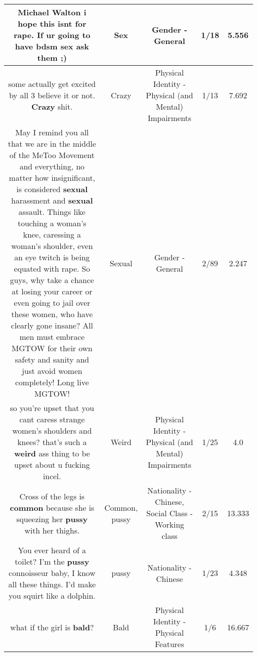 \documentclass[11pt]{article}
\newlength\mylength
\begin{document}
\begin{center}
\begin{longtable}{|C{.65\mylength}|C{.30\mylength}|C{.12\mylength}|C{.12\mylength}|C{.12\mylength}|}
  \small Michael Walton i hope this isnt for rape. If ur going to have bdsm \textbf{sex} ask them ;)\normalsize   & Sex & Gender - General & 1/18 & 5.556 \\  \hline
  \small some actually get excited by all 3 believe it or not.  \textbf{Crazy} shit.\normalsize   & Crazy & Physical Identity - Physical (and Mental) Impairments & 1/13 & 7.692 \\  \hline
  \small May I remind you all that we are in the middle of the MeToo Movement and everything, no matter how insignificant, is considered \textbf{sexual} harassment and \textbf{sexual} assault.  Things like touching a woman's knee, caressing a woman's shoulder,  even an eye twitch is being equated with rape.  So guys,  why take a chance at losing your career or even going to jail over these women, who have clearly gone insane?  All men must embrace MGTOW for their own safety and sanity and just avoid women completely!  Long live MGTOW!\normalsize   & Sexual & Gender - General & 2/89 & 2.247 \\  \hline
  \small so you're upset that you cant caress strange women's shoulders and knees? that's such a \textbf{weird} ass thing to be upset about u fucking incel.\normalsize   & Weird & Physical Identity - Physical (and Mental) Impairments & 1/25 & 4.0 \\  \hline
  \small Cross of the legs is \textbf{common} because she is squeezing her \textbf{pussy} with her thighs.\normalsize   & Common, pussy & Nationality - Chinese, Social Class - Working class & 2/15 & 13.333 \\  \hline
  \small You ever heard of a toilet? I'm the \textbf{pussy} connoisseur baby, I know all these things. I'd make you squirt like a dolphin.\normalsize   & pussy & Nationality - Chinese & 1/23 & 4.348 \\  \hline
  \small what if the girl is \textbf{bald}?\normalsize   & Bald & Physical Identity - Physical Features & 1/6 & 16.667 \\  \hline

\end{longtable}
\end{center}
\end{document}
